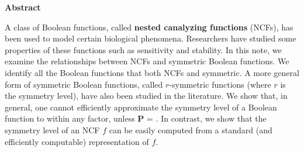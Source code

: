 \vspace*{-0.05in}
\begin{center}
\textbf{Abstract}  %
\end{center}

\smallskip

A class of Boolean functions, 
called \textbf{nested canalyzing functions} (NCFs),
has been used to model certain biological phenomena.
Researchers have studied some properties of these functions
such as sensitivity and stability.
In this note, we examine the relationships between NCFs and symmetric 
Boolean functions. 
We identify all the Boolean functions that both  NCFs and symmetric. 
A more general form of symmetric Boolean functions,
called $r$-symmetric functions (where $r$ is the symmetry level),
have also been studied in the literature.
We show that, in general,
one cannot efficiently approximate the symmetry level of
a Boolean function to within any factor, unless \textbf{P} = \cnp. 
In contrast, we show that the symmetry level of an NCF $f$
can be easily computed from a standard (and efficiently
computable) representation of $f$.
